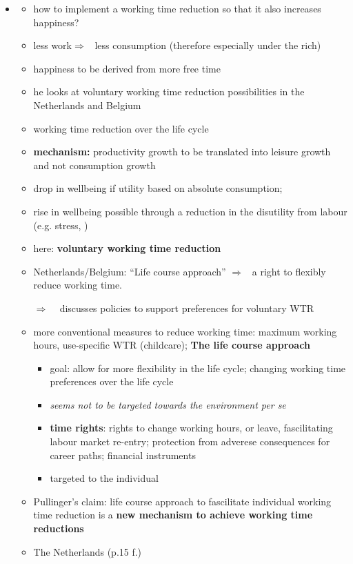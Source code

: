 \documentclass[12pt]{article}
\newcommand{\ar}{$\Rightarrow$ \ }
\begin{document}
\begin{itemize}
\item \cite{Pullinger2014WorkingDesign}
\begin{itemize}
\item how to implement a working time reduction so that it also increases happiness?
\item less work\ar less consumption (therefore especially under the rich)
\item happiness to be derived from more free time
\item he looks at voluntary working time reduction possibilities in the Netherlands and Belgium
\item working time reduction over the life cycle
\item \textbf{mechanism:} productivity growth to be translated into leisure growth and not consumption growth
\item drop in wellbeing if utility based on absolute consumption; 
\item rise in wellbeing possible through a reduction in the disutility from labour (e.g. stress, )
\item here: \textbf{voluntary working time reduction}
\item Netherlands/Belgium: ``Life course approach'' \ar a right to flexibly reduce working time. 
\item[\ar] discusses policies to support preferences for voluntary WTR
\item more conventional measures to reduce working time: 
maximum working hours, use-specific WTR (childcare); 
\textbf{The life course approach}
\begin{itemize}
	\item goal: allow for more flexibility in the life cycle; changing working time preferences over the life cycle
	\item \textit{seems not to be targeted towards the environment per se}
	\item \textbf{time rights}: rights to change working hours, or leave, fascilitating labour market re-entry; protection from adverese consequences for career paths; financial instruments
	\item targeted to the individual 
\end{itemize}
\item Pullinger's claim: life course approach to fascilitate individual working time reduction is a \textbf{new mechanism to achieve working time reductions}
\item The Netherlands (p.15 f.)
\begin{itemize}

\end{itemize}
\end{itemize}
\end{itemize}
\end{document}
